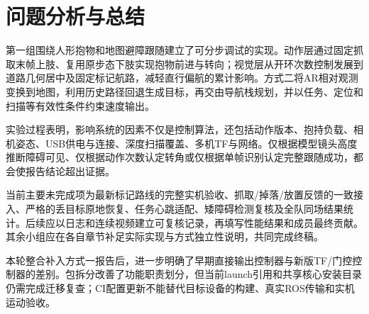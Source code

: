 \section{问题分析与总结}
第一组围绕人形抱物和地图避障跟随建立了可分步调试的实现。动作层通过固定抓取末帧上肢、复用原步态下肢实现抱物前进与转向；视觉层从开环次数控制发展到道路几何居中及固定标记航路，减轻直行偏航的累计影响。方式二将AR相对观测变换到地图，利用历史路径回退生成目标，再交由导航栈规划，并以任务、定位和扫描等有效性条件约束速度输出。

实验过程表明，影响系统的因素不仅是控制算法，还包括动作版本、抱持负载、相机姿态、USB供电与连接、深度扫描覆盖、多机TF与网络。仅根据模型镜头高度推断障碍可见、仅根据动作次数认定转角或仅根据单帧识别认定完整跟随成功，都会使报告结论超出证据。

当前主要未完成项为最新标记路线的完整实机验收、抓取/掉落/放置反馈的一致接入、严格的丢目标原地恢复、任务心跳适配、矮障碍检测复核及全队同场结果统计。后续应以日志和连续视频建立可复核记录，再填写性能结果和成员最终贡献。其余小组应在各自章节补足实际实现与方式独立性说明，共同完成终稿。

本轮整合补入方式一报告后，进一步明确了早期直接输出控制器与新版TF/门控控制器的差别。包拆分改善了功能职责划分，但当前launch引用和共享核心安装目录仍需完成迁移复查；CI配置更新不能替代目标设备的构建、真实ROS传输和实机运动验收。

